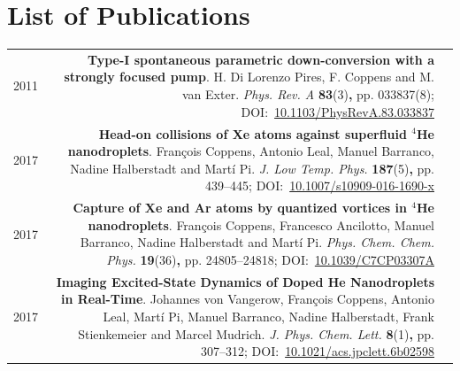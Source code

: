 \chapter*{List of Publications}
\begin{tabular}{l!{\VRule}Rc}
	2011 & \textbf{Type-I spontaneous parametric down-conversion with a strongly focused pump}. H. Di Lorenzo Pires, F. Coppens and M. van Exter. \emph{Phys. Rev. A} \textbf{83}(3)\textbf{,} pp. 033837(8); DOI:~\href{http://link.aps.org/doi/10.1103/PhysRevA.83.033837}{10.1103/PhysRevA.83.033837}&\vspace{20pt}\\
	2017 & \textbf{Head-on collisions of {Xe} atoms against superfluid $^4${H}e nanodroplets}. Fran\c{c}ois Coppens, Antonio Leal, Manuel Barranco, Nadine Halberstadt and Mart\'{i} Pi. \emph{J. Low Temp. Phys.} \textbf{187}(5)\textbf{,} pp. 439--445; DOI:~\href{https://doi.org/10.1007/s10909-016-1690-x}{10.1007/s10909-016-1690-x}&\vspace{20pt}\\
	2017 & \textbf{Capture of Xe and Ar atoms by quantized vortices in $^4$He nanodroplets}. Fran\c{c}ois Coppens, Francesco Ancilotto, Manuel Barranco, Nadine Halberstadt and Mart\'{i} Pi. \emph{Phys. Chem. Chem. Phys.} \textbf{19}(36)\textbf{,} pp. 24805--24818; DOI:~\href{http://dx.doi.org/10.1039/C7CP03307A}{10.1039/C7CP03307A}&\vspace{20pt}\\
	2017 & \textbf{Imaging Excited-State Dynamics of Doped He Nanodroplets in Real-Time}. Johannes von Vangerow, Fran\c{c}ois Coppens, Antonio Leal, Mart\'{i} Pi, Manuel Barranco, Nadine Halberstadt, Frank Stienkemeier and Marcel Mudrich. \emph{J. Phys. Chem. Lett.} \textbf{8}(1)\textbf{,} pp. 307--312; DOI:~\href{http://dx.doi.org/10.1021/acs.jpclett.6b02598}{10.1021/acs.jpclett.6b02598}&\vspace{20pt}\\

\end{tabular}
